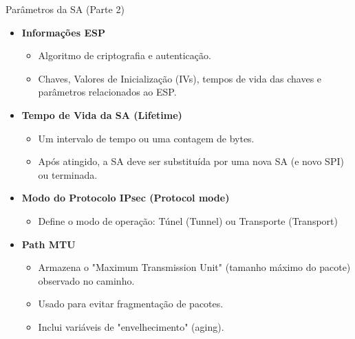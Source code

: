 \begin{frame}{Parâmetros da SA (Parte 2)}
    \begin{itemize}

        \item \textbf{Informações ESP}
              \begin{itemize}
                  \item Algoritmo de criptografia e autenticação.
                  \item Chaves, Valores de Inicialização (IVs), tempos de vida das chaves e parâmetros relacionados ao ESP.
              \end{itemize}

        \item \textbf{Tempo de Vida da SA (Lifetime)}
              \begin{itemize}
                  \item Um intervalo de tempo ou uma contagem de bytes.
                  \item Após atingido, a SA deve ser substituída por uma nova SA (e novo SPI) ou terminada.
              \end{itemize}

        \item \textbf{Modo do Protocolo IPsec (Protocol mode)}
              \begin{itemize}
                  \item Define o modo de operação: Túnel (Tunnel) ou Transporte (Transport)
              \end{itemize}

        \item \textbf{Path MTU}
              \begin{itemize}
                  \item Armazena o "Maximum Transmission Unit" (tamanho máximo do pacote) observado no caminho.
                  \item Usado para evitar fragmentação de pacotes.
                  \item Inclui variáveis de "envelhecimento" (aging).
              \end{itemize}
    \end{itemize}
\end{frame}

